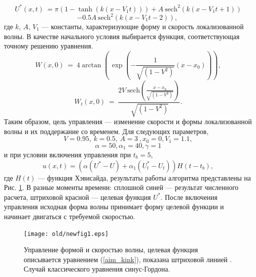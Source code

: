 %
%
$$
U^*(x,t)~=\pi  (1-\tanh (k (x- V_1 t)))+A~ {\text{sech}}^2(k (x-V_1 t+1))
$$
\begin{equation}
	 -0.5 A~ {\text{sech}}^2(k (x- V_1 t-2)),~\label{aim_kink}
\end{equation}
где  $k$, $A$, $V_1$ --- константы, характеризующие форму и скорость локализованной волны. В качестве начального условия выбирается функция, соответствующая точному решению уравнения. 
$$
W(x,0)~=~4 \arctan \left(\frac{}{}\exp \left(- \frac{1}{\sqrt{(1-V^2)}}(x-x_0)\right)\right),
$$
$$
W_t (x,0)~=~\frac{2 V~ {\text{sech}}\left(\frac{x-x_0}{\sqrt{(1-V^2)}}\right)}{~\sqrt{(1-V^2)}}.
$$
Таким образом, цель управления --- изменение скорости и формы локализованной волны и их поддержание со временем. Для следующих параметров,
\[
V=0.95,~k=0.5,~A=3~, x_0=0, V_1=1.1,
\]
%
\[
\alpha=50, \alpha_1=40, \gamma = 1
\]
и при условии включения управления при $t_b=5$,
$$
u(x,t) = (\alpha (U^* - U)+\alpha_1 (U_t^*-U_t)) H(t-t_b),
$$
где $H(t)$ --- функция Хэвисайда, результаты работы алгоритма представлены на Рис. \ref{f:ris2}. В разные моменты времени: сплошной синей --- результат численного расчета, штриховой красной --- целевая функция  $U^*$. После включения управления исходная форма волны принимает форму целевой функции и начинает двигаться с требуемой скоростью.

\begin{figure}
	\begin{center}
		\texttt{[image: old/newfig1.eps]}
	\end{center}
	\caption{\label{f:ris2}Управление формой и скоростью волны, целевая функция описывается уравнением (\ref{aim_kink}), показана штриховой линией \cite{porant16}.  Случай классического уравнения синус-Гордона.}
\end{figure}

